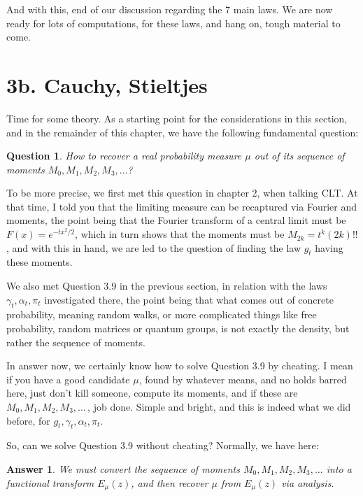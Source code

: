 \documentclass[12pt]{amsbook}
\newtheorem{answer}[theorem]{Answer}
\newtheorem{question}[theorem]{Question}
\begin{document}
And with this, end of our discussion regarding the 7 main laws. We are now ready for lots of computations, for these laws, and hang on, tough material to come.

\section*{3b. Cauchy, Stieltjes}

Time for some theory. As a starting point for the considerations in this section, and in the remainder of this chapter, we have the following fundamental question:

\begin{question}
How to recover a real probability measure $\mu$ out of its sequence of moments $M_0,M_1,M_2,M_3,\ldots$?
\end{question}

To be more precise, we first met this question in chapter 2, when talking CLT. At that time, I told you that the limiting measure can be recaptured via Fourier and moments, the point being that the Fourier transform of a central limit must be $F(x)=e^{-tx^2/2}$, which in turn shows that the moments must be $M_{2k}=t^k(2k)!!$, and with this in hand, we are led to the question of finding the law $g_t$ having these moments.

\bigskip

We also met Question 3.9 in the previous section, in relation with the laws $\gamma_t,\alpha_t,\pi_t$ investigated there, the point being that what comes out of concrete probability, meaning random walks, or more complicated things like free probability, random matrices or quantum groups, is not exactly the density, but rather the sequence of moments.

\bigskip

In answer now, we certainly know how to solve Question 3.9 by cheating. I mean if you have a good candidate $\mu$, found by whatever means, and no holds barred here, just don't kill someone, compute its moments, and if these are $M_0,M_1,M_2,M_3,\ldots\,$, job done. Simple and bright, and this is indeed what we did before, for $g_t,\gamma_t,\alpha_t,\pi_t$.

\bigskip

So, can we solve Question 3.9 without cheating? Normally, we have here:

\begin{answer}
We must convert the sequence of moments $M_0,M_1,M_2,M_3,\ldots$ into a functional transform $E_\mu(z)$, and then recover $\mu$ from $E_\mu(z)$ via analysis.
\end{answer}
\end{document}
